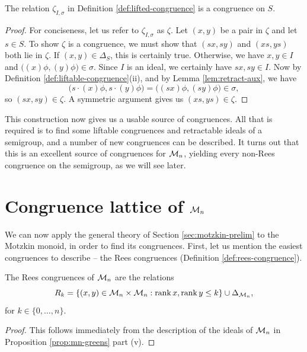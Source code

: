 \begin{theorem}
  \label{thm:lifted-congruence}
  The relation $\zeta_{I,\sigma}$ in Definition \ref{def:lifted-congruence} is a
  congruence on $S$.
  \begin{proof}
    For conciseness, let us refer to $\zeta_{I,\sigma}$ as $\zeta$.  Let $(x,y)$
    be a pair in $\zeta$ and let $s \in S$.  To show $\zeta$ is a congruence, we
    must show that $(sx,sy)$ and $(xs,ys)$ both lie in $\zeta$.  If
    $(x,y) \in \Delta_S$, this is certainly true.  Otherwise, we have
    $x, y \in I$ and $\big((x)\phi, (y)\phi\big) \in \sigma$.  Since $I$ is an
    ideal, we certainly have $sx,sy\in I$.  Now by Definition
    \ref{def:liftable-congruence}(ii), and by Lemma
    \ref{lem:retract-aux}, we have
    $$\big(s \cdot (x)\phi, s \cdot (y)\phi\big)
    = \big((sx)\phi, (sy)\phi\big) \in \sigma,$$
    so $(sx, sy) \in \zeta$.  A symmetric argument gives us $(xs,ys) \in \zeta$.
  \end{proof}
\end{theorem}

This construction now gives us a usable source of congruences.  All that is
required is to find some liftable congruences and retractable ideals of a
semigroup, and a number of new congruences can be described.  It turns out that
this is an excellent source of congruences for $\mathcal{M}_n$, yielding every non-Rees
congruence on the semigroup, as we will see later.

\section{Congruence lattice of $\mathcal{M}_n$}
\label{sec:motzkin-congs}


We can now apply the general theory of Section \ref{sec:motzkin-prelim} to the
Motzkin monoid, in order to find its congruences.  First, let us mention the
easiest congruences to describe -- the Rees congruences (Definition
\ref{def:rees-congruence}).

\begin{proposition}
  \label{prop:motzkin-rees}
  The Rees congruences of $\mathcal{M}_n$ are the relations
  $$R_k = \{(x,y) \in \mathcal{M}_n \times \mathcal{M}_n : \operatorname{rank} x, \operatorname{rank} y \leq k\} \cup
  \Delta_{\mathcal{M}_n},$$
  for $k \in \{0, \ldots, n\}$.
  \begin{proof}
    This follows immediately from the description of the ideals of $\mathcal{M}_n$ in
    Proposition \ref{prop:mn-greens} part (v).
  \end{proof}
\end{proposition}

